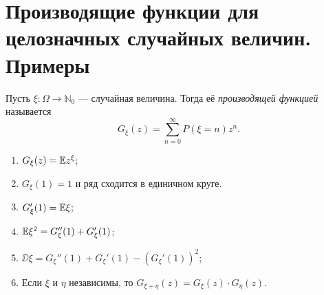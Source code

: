\section{Производящие функции для целозначных случайных величин. Примеры}

\begin{definition}
    Пусть $\xi \colon \Omega\rightarrow \mathbb{N}_0$ --- случайная величина. Тогда её \textit{производящей функцией} называется
    $$G_\xi(z)= \overset{\infty}{\underset{n = 0}{\sum}} P(\xi = n)z^n.$$
\end{definition}

\begin{properties}
\enewline
    \begin{enumerate}
        \item $G_\xi(z) = \mathbb{E} z^\xi$;

        \item $G_\xi(1) = 1$ и ряд сходится в единичном круге.

        \item $G_\xi'(1) = \mathbb{E} \xi$;

        \item $\mathbb{E} \xi^2 = G_\xi''(1) + G_\xi'(1)$;

        \item $\DD\xi = G_\xi''(1) + G_\xi'(1) - (G_\xi'(1))^2$;

        \item Если $\xi$ и $\eta$ независимы, то $G_{\xi + \eta}(z) = G_\xi(z)\cdot G_\eta(z)$.

           
    \end{enumerate}
\end{properties}
